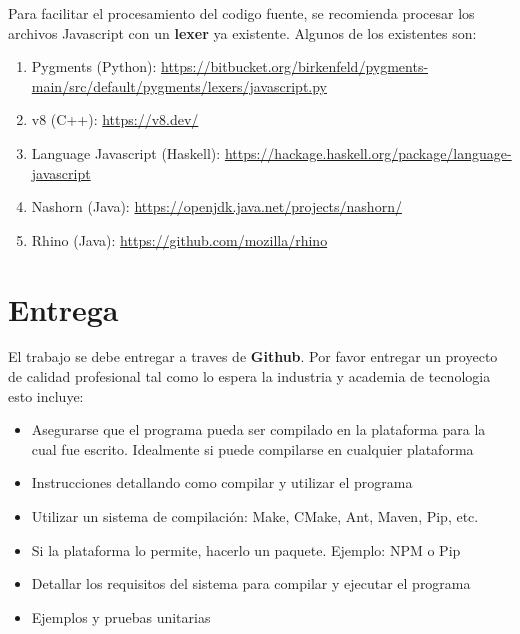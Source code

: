 \documentclass{article}
\begin{document}
Para facilitar el procesamiento del codigo fuente, se recomienda procesar los archivos Javascript
con un {\bf lexer} ya existente. Algunos de los existentes son:
\begin{enumerate}
        \item{Pygments (Python): \url{https://bitbucket.org/birkenfeld/pygments-main/src/default/pygments/lexers/javascript.py}}
        \item{v8 (C++): \url{https://v8.dev/}}
        \item{Language Javascript (Haskell): \url{https://hackage.haskell.org/package/language-javascript}}
        \item{Nashorn (Java): \url{https://openjdk.java.net/projects/nashorn/}}
        \item{Rhino (Java): \url{https://github.com/mozilla/rhino}}
\end{enumerate}

\section{Entrega}
El trabajo se debe entregar a traves de {\bf Github}. Por favor entregar un proyecto de calidad
profesional tal como lo espera la industria y academia de tecnologia esto incluye:
\begin{itemize}
        \item{Asegurarse que el programa pueda ser compilado en la plataforma para la cual
        fue escrito. Idealmente si puede compilarse en cualquier plataforma}
        \item{Instrucciones detallando como compilar y utilizar el programa}
        \item{Utilizar un sistema de compilaci\'on: Make, CMake, Ant, Maven, Pip, etc.}
        \item{Si la plataforma lo permite, hacerlo un paquete. Ejemplo: NPM o Pip}
        \item{Detallar los requisitos del sistema para compilar y ejecutar el programa}
        \item{Ejemplos y pruebas unitarias}
\end{itemize}
\end{document}
